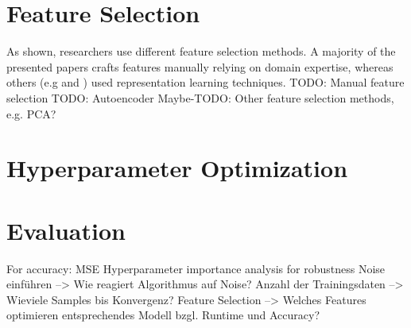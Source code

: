 \section{Feature Selection}

As shown, researchers use different feature selection methods. A majority of the presented papers crafts features manually relying on domain expertise, whereas others (e.g \cite{Siripanpornchana2016_AnnWithDbnFS} and \cite{Huang2018_GBDT}) used representation learning techniques.
\newline
TODO: Manual feature selection
\newline 
TODO: Autoencoder
\newline
Maybe-TODO: Other feature selection methods, e.g. PCA?

\section{Hyperparameter Optimization}

\section{Evaluation} 
For accuracy: MSE 
\newline
Hyperparameter importance analysis for robustness
\newline
Noise einführen 
--> Wie reagiert Algorithmus auf Noise?
\newline
Anzahl der Trainingsdaten 
--> Wieviele Samples bis Konvergenz?
\newline
Feature Selection
--> Welches Features optimieren entsprechendes Modell bzgl. Runtime und Accuracy?

